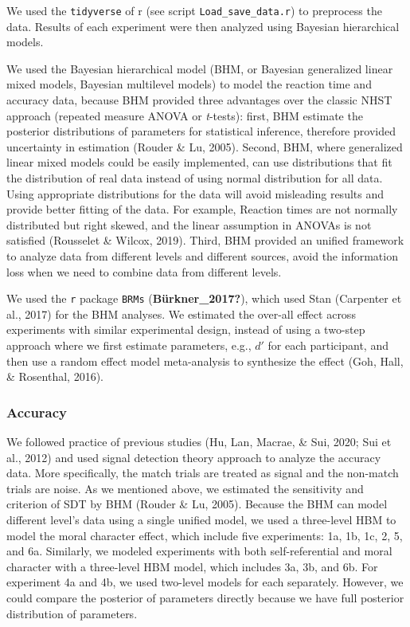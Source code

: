 \documentclass[
  man]{apa6}
\begin{document}
We used the \texttt{tidyverse} of r (see script \texttt{Load\_save\_data.r}) to preprocess the data. Results of each experiment were then analyzed using Bayesian hierarchical models.

We used the Bayesian hierarchical model (BHM, or Bayesian generalized linear mixed models, Bayesian multilevel models) to model the reaction time and accuracy data, because BHM provided three advantages over the classic NHST approach (repeated measure ANOVA or \emph{t}-tests): first, BHM estimate the posterior distributions of parameters for statistical inference, therefore provided uncertainty in estimation (Rouder \& Lu, 2005). Second, BHM, where generalized linear mixed models could be easily implemented, can use distributions that fit the distribution of real data instead of using normal distribution for all data. Using appropriate distributions for the data will avoid misleading results and provide better fitting of the data. For example, Reaction times are not normally distributed but right skewed, and the linear assumption in ANOVAs is not satisfied (Rousselet \& Wilcox, 2019). Third, BHM provided an unified framework to analyze data from different levels and different sources, avoid the information loss when we need to combine data from different levels.

We used the \texttt{r} package \texttt{BRMs} (\textbf{Bürkner\_2017?}), which used Stan (Carpenter et al., 2017) for the BHM analyses. We estimated the over-all effect across experiments with similar experimental design, instead of using a two-step approach where we first estimate parameters, e.g., \(d'\) for each participant, and then use a random effect model meta-analysis to synthesize the effect (Goh, Hall, \& Rosenthal, 2016).

\hypertarget{accuracy}{%
\subsubsection{Accuracy}\label{accuracy}}

We followed practice of previous studies (Hu, Lan, Macrae, \& Sui, 2020; Sui et al., 2012) and used signal detection theory approach to analyze the accuracy data. More specifically, the match trials are treated as signal and the non-match trials are noise. As we mentioned above, we estimated the sensitivity and criterion of SDT by BHM (Rouder \& Lu, 2005). Because the BHM can model different level's data using a single unified model, we used a three-level HBM to model the moral character effect, which include five experiments: 1a, 1b, 1c, 2, 5, and 6a. Similarly, we modeled experiments with both self-referential and moral character with a three-level HBM model, which includes 3a, 3b, and 6b. For experiment 4a and 4b, we used two-level models for each separately. However, we could compare the posterior of parameters directly because we have full posterior distribution of parameters.
\end{document}
